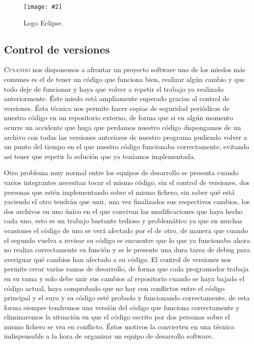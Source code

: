 \documentclass[12pt,a4paper,spanish]{book} %
\newcommand{\imgCentradaPeq}[3]{
\begin{figure}[H]
\begin{center}
\texttt{[image: \#2]}
\caption{#3}
\label{#1}
\end{center}
\end{figure}
}
\begin{document}
\imgCentradaPeq{fig.2.11}{img/eclipse.eps}{Logo Eclipse.}

\subsection{Control de versiones}

\lettrine{C}{usando} nos disponemos a afrontar un proyecto software uno de los miedos más comunes es el de tener un código que funciona bien, realizar algún cambio y que todo deje de funcionar y haya que volver a repetir el trabajo ya realizado anteriormente. Éste miedo está ampliamente superado gracias al control de versiones. Ésta técnica nos permite hacer copias de seguridad periódicas de nuestro código en un repositorio externo, de forma que si en algún momento ocurre un accidente que haga que perdamos nuestro código dispongamos de un archivo con todas las versiones anteriores de nuestro programa pudiendo volver a un punto del tiempo en el que nuestro código funcionaba correctamente, evitando así tener que repetir la solución que ya teníamos implementada.

Otro problema muy normal entre los equipos de desarrollo se presenta cuando varios integrantes necesitan tocar el mismo código, sin el control de versiones, dos personas que estén implementando sobre el mismo fichero, sin saber qué está yaciendo el otro tendrán que unir, una vez finalizados sus respectivos cambios, los dos archivos en uno único en el que convivan las modificaciones que haya hecho cada uno, esto es un trabajo bastante tedioso y problemático ya que en muchas ocasiones el código de uno se verá afectado por el de otro, de manera que cuando el segundo vuelva a revisar su código se encuentre que lo que ya funcionaba ahora no realiza correctamente su función y se le presente una dura tarea de debug para averiguar qué cambios han afectado a su código. El control de versiones nos permite crear varias ramas de desarrollo, de forma que cada programador trabaja en su rama y solo debe unir sus cambios al repositorio cuando se haya bajado el código actual, haya comprobado que no hay con conflictos entre el código principal y el suyo y su  código esté probado y funcionando correctamente, de esta forma siempre tendremos una versión del código que funciona correctamente y eliminaremos la situación en que el código escrito por dos personas sobre el mismo fichero se vea en conflicto. Éstos motivos la convierten en una técnica indispensable a la hora de organizar un equipo de desarrollo software.
\end{document}
